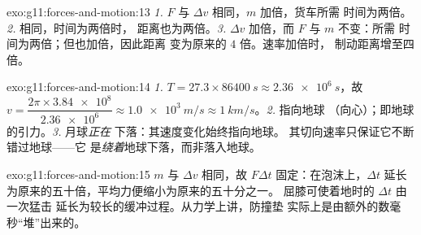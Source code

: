 \begin{solution}{exo:g11:forces-and-motion:13}
\emph{1.} $F$ 与 $\Delta v$ 相同，$m$ 加倍，货车所需
时间为两倍。\emph{2.} 相同，时间为两倍时，
距离也为两倍。\emph{3.} $\Delta v$ 加倍，而 $F$ 与 $m$ 不变：所需
时间为两倍；但也加倍，因此距离
变为原来的 $4$ 倍。速率加倍时，
制动距离增至四倍。
\end{solution}

\begin{solution}{exo:g11:forces-and-motion:14}
\emph{1.} $T = 27.3 \times \qty{86400}{s} \approx \qty{2.36e6}{s}$，故
$v = \dfrac{2\pi \times \num{3.84e8}}{\num{2.36e6}} \approx
\qty{1.0e3}{m/s} \approx \qty{1}{km/s}$。\emph{2.} 指向地球
（向心）；即地球的引力。\emph{3.} 月球\emph{正在}
下落：其速度变化始终指向地球。
其切向速率只保证它不断错过地球——它
是\emph{绕着}地球下落，而非落入地球。
\end{solution}

\begin{solution}{exo:g11:forces-and-motion:15}
$m$ 与 $\Delta v$ 相同，故 $F\Delta t$ 固定：在泡沫上，$\Delta t$
延长为原来的五十倍，平均力便缩小为原来的五十分之一。
屈膝可使着地时的 $\Delta t$ 由一次猛击
延长为较长的缓冲过程。从力学上讲，防撞垫
实际上是由额外的数毫秒“堆”出来的。
\end{solution}

